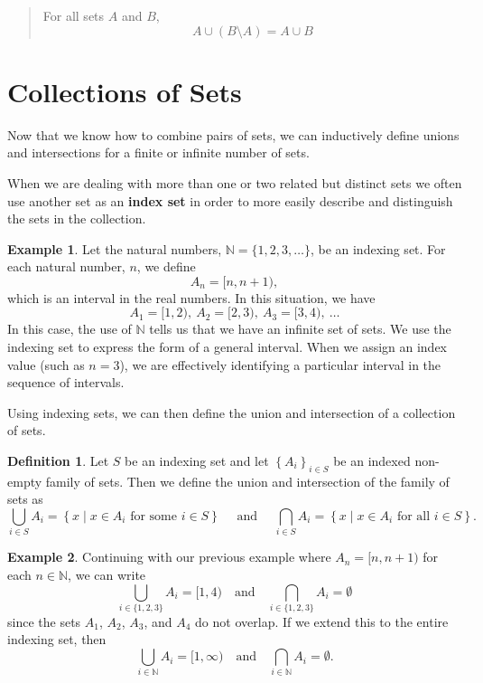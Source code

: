 \documentclass[
]{book}
\theoremstyle{definition}
\newtheorem{definition}{Definition}[chapter]
\theoremstyle{definition}
\newtheorem{example}{Example}[chapter]
\theoremstyle{definition}
\theoremstyle{definition}
\theoremstyle{remark}
\begin{document}
\begin{quote}
For all sets \(A\) and \(B\), \[A \cup (B\setminus A)= A \cup B\]
\end{quote}

\hypertarget{collections-of-sets}{%
\section{Collections of Sets}\label{collections-of-sets}}

Now that we know how to combine pairs of sets, we can inductively define unions and intersections for a finite or infinite number of sets.

When we are dealing with more than one or two related but distinct sets we often use another set as an \textbf{index set} in order to more easily describe and distinguish the sets in the collection.

\begin{example}
Let the natural numbers, \(\mathbb{N}=\{1, 2, 3, \ldots \}\), be an indexing set. For each natural number, \(n\), we define \[A_n = [n,n+1),\] which is an interval in the real numbers. In this situation, we have
\[A_1 = [1,2), \:  A_2 = [2,3), \: A_3 = [3,4),\:  \ldots \]
In this case, the use of \(\mathbb{N}\) tells us that we have an infinite set of sets. We use the indexing set to express the form of a general interval. When we assign an index value (such as \(n=3\)), we are effectively identifying a particular interval in the sequence of intervals.
\end{example}

Using indexing sets, we can then define the union and intersection of a collection of sets.

\begin{definition}
\protect\hypertarget{def:set-indexing}{}\label{def:set-indexing}Let \(S\) be an indexing set and let \(\left\{ A_i\right\}_{i\in S}\) be an indexed non-empty family of sets. Then we define the union and intersection of the family of sets as
\[\bigcup_{i\in S} A_i = \left\{ x \middle \vert x\in A_i \mbox{ for some } i\in S\right\} \quad \mbox{ and } \quad \bigcap_{i\in S} A_i = \left\{ x\middle \vert x\in A_i \mbox{ for all } i \in S\right\}.\]
\end{definition}

\begin{example}
\protect\hypertarget{exm:disjoint}{}\label{exm:disjoint}Continuing with our previous example where \(A_n= [n,n+1)\) for each \(n\in \mathbb{N}\), we can write
\[\bigcup_{i\in \{1,2,3\}} A_i = [1,4) \quad \mbox{and} \quad \bigcap_{i\in \{1,2,3\}} A_i = \emptyset\]
since the sets \(A_1\), \(A_2\), \(A_3\), and \(A_4\) do not overlap. If we extend this to the entire indexing set, then \[\bigcup_{i\in \mathbb{N}} A_i = [1,\infty) \quad \mbox{and} \quad \bigcap_{i\in \mathbb{N}} A_i = \emptyset.\]
\end{example}
\end{document}
